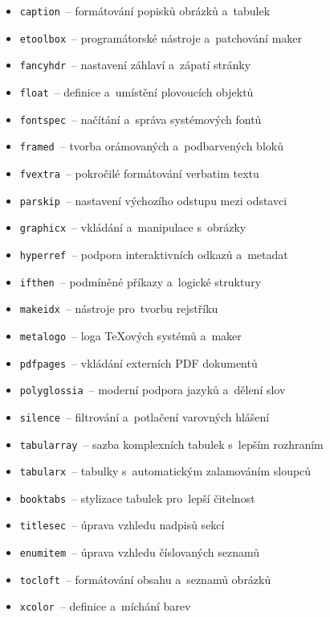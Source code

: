 \documentclass[a4paper,12pt,fonts,numbering,listingsleft]{./tulpackage/tularticle}
\newcommand{\cmdfont}[1]{\texttt{\color{\tulcolor}#1}}
\begin{document}
\begin{itemize}[label={}]
    \item \cmdfont{caption}~-- formátování popisků obrázků a~tabulek
    \item \cmdfont{etoolbox}~-- programátorské nástroje a~patchování maker
    \item \cmdfont{fancyhdr}~-- nastavení záhlaví a~zápatí stránky
    \item \cmdfont{float}~-- definice a~umístění plovoucích objektů
    \item \cmdfont{fontspec}~-- načítání a~správa systémových fontů
    \item \cmdfont{framed}~-- tvorba orámovaných a~podbarvených bloků
    \item \cmdfont{fvextra}~-- pokročilé formátování verbatim textu
    \item \cmdfont{parskip}~-- nastavení výchozího odstupu mezi odstavci
    \item \cmdfont{graphicx}~-- vkládání a~manipulace s~obrázky
    \item \cmdfont{hyperref}~-- podpora interaktivních odkazů a~metadat
    \item \cmdfont{ifthen}~-- podmíněné příkazy a~logické struktury
    \item \cmdfont{makeidx}~-- nástroje pro~tvorbu rejstříku
    \item \cmdfont{metalogo}~-- loga \TeX{}ových systémů a~maker
    \item \cmdfont{pdfpages}~-- vkládání externích PDF dokumentů
    \item \cmdfont{polyglossia}~-- moderní podpora jazyků a~dělení slov
    \item \cmdfont{silence}~-- filtrování a~potlačení varovných hlášení
    \item \cmdfont{tabularray}~-- sazba komplexních tabulek s~lepším rozhraním
    \item \cmdfont{tabularx}~-- tabulky s~automatickým zalamováním sloupců
    \item \cmdfont{booktabs}~-- stylizace tabulek pro~lepší čitelnost
    \item \cmdfont{titlesec}~-- úprava vzhledu nadpisů sekcí
    \item \cmdfont{enumitem}~-- úprava vzhledu číslovaných seznamů
    \item \cmdfont{tocloft}~-- formátování obsahu a~seznamů obrázků
    \item \cmdfont{xcolor}~-- definice a~míchání barev
\end{itemize}
\end{document}
